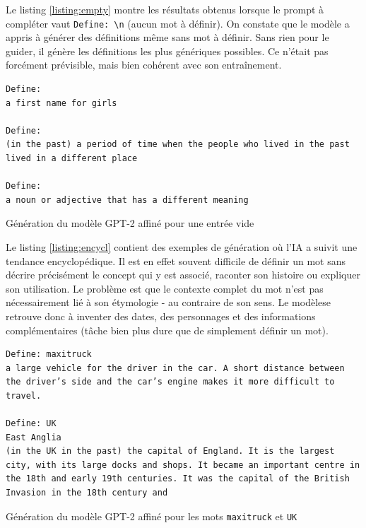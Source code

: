 \documentclass[french]{template}
\begin{document}
Le listing \ref{listing:empty} montre les résultats obtenus lorsque le prompt à compléter vaut \texttt{Define: \textbackslash n} (aucun mot à définir). On constate que le modèle a appris à générer des définitions même sans mot à définir. Sans rien pour le guider, il génère les définitions les plus génériques possibles. Ce n'était pas forcément prévisible, mais bien cohérent avec son entraînement.

\begin{listing}[H]
    \begin{verbatim}
Define:
a first name for girls

Define:
(in the past) a period of time when the people who lived in the past lived in a different place

Define:
a noun or adjective that has a different meaning
    \end{verbatim}
    \caption{Génération du modèle GPT-2 affiné pour une entrée vide}
    \label{listing:empty}
\end{listing}

Le listing \ref{listing:encycl} contient des exemples de génération où l'IA a suivit une tendance encyclopédique. Il est en effet souvent difficile de définir un mot sans décrire précisément le concept qui y est associé, raconter son histoire ou expliquer son utilisation. Le problème est que le contexte complet du mot n'est pas nécessairement lié à son étymologie - au contraire de son sens. Le modèlese retrouve donc à inventer des dates, des personnages et des informations complémentaires (tâche bien plus dure que de simplement définir un mot).

\begin{listing}[H]
    \begin{verbatim}
Define: maxitruck
a large vehicle for the driver in the car. A short distance between the driver’s side and the car’s engine makes it more difficult to travel.

Define: UK
East Anglia
(in the UK in the past) the capital of England. It is the largest city, with its large docks and shops. It became an important centre in the 18th and early 19th centuries. It was the capital of the British Invasion in the 18th century and
    \end{verbatim}
    \caption{Génération du modèle GPT-2 affiné pour les mots \texttt{maxitruck} et \texttt{UK}}
    \label{listing:encycl}
\end{listing}
\end{document}

